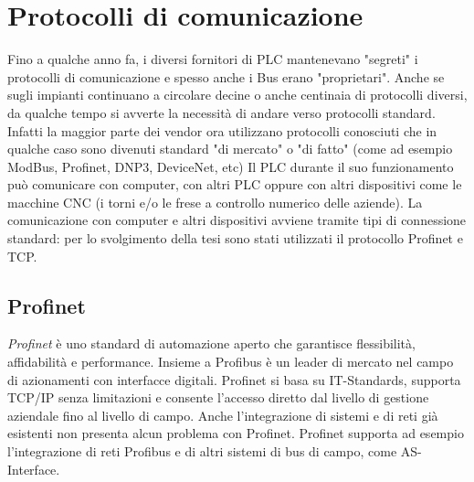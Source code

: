 \documentclass[12pt, a4paper, oneside]{book}
\begin{document}
\chapter{Protocolli di comunicazione}
Fino a qualche anno fa, i diversi fornitori di PLC mantenevano "segreti" i protocolli di comunicazione e spesso anche i Bus erano "proprietari". Anche se sugli impianti continuano a circolare decine o anche centinaia di protocolli diversi, da qualche tempo si avverte la necessità di andare verso protocolli standard. Infatti la maggior parte dei vendor ora utilizzano protocolli conosciuti che in qualche caso sono divenuti standard "di mercato" o "di fatto" (come ad esempio ModBus, Profinet, DNP3, DeviceNet, etc)
Il PLC durante il suo funzionamento può comunicare con computer, con altri PLC oppure con altri dispositivi come le macchine CNC (i torni e/o le frese a controllo numerico delle aziende). La comunicazione con computer e altri dispositivi avviene tramite tipi di connessione standard: per lo svolgimento della tesi sono stati utilizzati il protocollo Profinet e TCP.
\section{Profinet}
\textit{Profinet} \cite{profinet} è uno standard di automazione aperto che garantisce flessibilità, affidabilità
e performance.
Insieme a Profibus è un leader di mercato nel campo di azionamenti con interfacce digitali. Profinet si basa su IT-Standards, supporta TCP/IP senza limitazioni e consente l’accesso diretto dal livello di gestione aziendale fino al livello di campo. Anche l’integrazione di sistemi e di reti già esistenti non presenta alcun problema con Profinet. Profinet supporta ad esempio l’integrazione di reti Profibus e di altri sistemi di bus di campo, come AS-Interface.  
\end{document}
